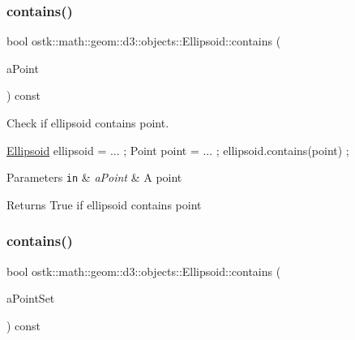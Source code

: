 \subsubsection{\texorpdfstring{contains()}{contains()}\hspace{0.1cm}{\footnotesize\ttfamily [1/3]}}
{\footnotesize\ttfamily bool ostk\+::math\+::geom\+::d3\+::objects\+::\+Ellipsoid\+::contains (\begin{DoxyParamCaption}\item[{const \hyperlink{classostk_1_1math_1_1geom_1_1d3_1_1objects_1_1_point}{Point} \&}]{a\+Point }\end{DoxyParamCaption}) const}



Check if ellipsoid contains point. 


\begin{DoxyCode}
\hyperlink{classostk_1_1math_1_1geom_1_1d3_1_1objects_1_1_ellipsoid_acd84276f65a14db12623402a411712b7}{Ellipsoid} ellipsoid = ... ;
Point point = ... ;
ellipsoid.contains(point) ;
\end{DoxyCode}



\begin{DoxyParams}[1]{Parameters}
\mbox{\tt in}  & {\em a\+Point} & A point \\
\hline
\end{DoxyParams}
\begin{DoxyReturn}{Returns}
True if ellipsoid contains point 
\end{DoxyReturn}
\mbox{\label{classostk_1_1math_1_1geom_1_1d3_1_1objects_1_1_ellipsoid_a9e0b0c5c2db95f53da783ccfea36de17}} 
\subsubsection{\texorpdfstring{contains()}{contains()}\hspace{0.1cm}{\footnotesize\ttfamily [2/3]}}
{\footnotesize\ttfamily bool ostk\+::math\+::geom\+::d3\+::objects\+::\+Ellipsoid\+::contains (\begin{DoxyParamCaption}\item[{const \hyperlink{classostk_1_1math_1_1geom_1_1d3_1_1objects_1_1_point_set}{Point\+Set} \&}]{a\+Point\+Set }\end{DoxyParamCaption}) const}



